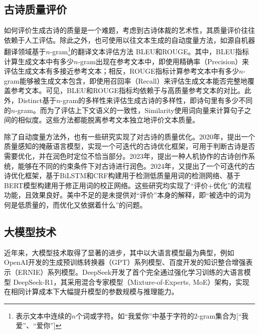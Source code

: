 \subsection{古诗质量评价}
如何评价生成古诗的质量是一个难题，考虑到古诗体裁的艺术性，其质量评价往往依赖于人工评估。除此之外，也可使用以往文本生成的自动度量方法，如源自机器翻译领域基于$n$-gram\footnote{表示文本中连续的$n$个词或字符。如“我爱你”中基于字符的$2$-gram集合为[“我爱”、“爱你”]}的翻译文本评估方法
BLEU\cite{papineniBLEUMethodAutomatic2002}和ROUGE\cite{linROUGEPackageAutomatic2004}。其中，BLEU指标计算生成文本中有多少$n$-gram出现在参考文本中，即使用精确率（Precision）来评估生成文本有多接近参考文本；相反，ROUGE指标计算参考文本中有多少$n$-gram能够被生成文本包含，即使用召回率（Recall）来评估生成文本能否完整地覆盖参考文本。可见，BLEU和ROUGE指标均依赖于与高质量参考文本的对比。此外，Distinct\cite{liDiversityPromotingObjectiveFunction2016}基于$n$-gram的多样性来评估生成古诗的多样性，即诗句里有多少不同的$n$-gram。而为了评估上下文语义的一致性，Similarity\cite{wietingUniversalParaphrasticSentence2016a}使用词向量来计算句子之间的相似度。这些方法都能脱离参考文本独立地评价文本质量。

除了自动度量方法外，也有一些研究实现了对古诗的质量优化。2020年，\cite{dengIterativePolishingFramework2020}提出一个质量感知的掩蔽语言模型，实现一个可迭代的古诗优化框架，可用于判断古诗是否需要优化，并在润色时定位不恰当部分。2023年，\cite{maYuShengHumaninLoop2023}提出一种人机协作的古诗创作系统，能够在不同的约束条件下对古诗进行润色。2024年，\cite{chenPolishingModelMachineGenerated2024}又提出了一个可迭代的古诗优化框架，基于BiLSTM和CRF构建用于检测低质量用词的检测网络、基于BERT模型构建用于修正用词的校正网络。这些研究均实现了“评价+优化”的流程功能，且效果良好。美中不足的是未提供对“评价”本身的解释，即“被选中的词为何是低质量的，而优化又依据着什么”的问题。

\subsection{大模型技术}
近年来，大模型技术取得了显著的进步，其中以大语言模型最为典型，例如OpenAI开发的生成预训练转换器（GPT）系列模型、百度开发的知识整合增强表示（ERNIE）系列模型\cite{zhangERNIEEnhancedLanguage2019}。DeepSeek开发了首个完全通过强化学习训练的大语言模型 DeepSeek-R1\cite{deepseek-aiDeepSeekR1IncentivizingReasoning2025}，其采用混合专家模型（Mixture-of-Experts, MoE）架构，实现在相同计算成本下大幅提升模型的参数规模与推理能力。

